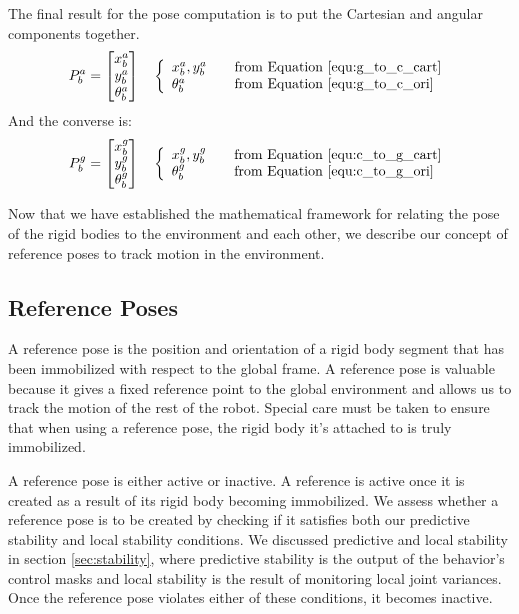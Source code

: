 The final result for the pose computation is to put the Cartesian and angular components together.
\begin{equation}
P_b^a =
\begin{bmatrix}
x_b^a \\
y_b^a \\
\theta_b^a 
\end{bmatrix}
\quad
\left\{ 
  \begin{array}{l l}
    x_b^a,y_b^a & \quad \text{from Equation \ref{equ:g_to_c_cart}}\\
    \theta_b^a & \quad \text{from Equation \ref{equ:g_to_c_ori}}
  \end{array} \right.
\end{equation}
And the converse is:
\begin{equation}
P_b^g =
\begin{bmatrix}
x_b^g \\
y_b^g \\
\theta_b^g 
\end{bmatrix}
\quad
\left\{ 
  \begin{array}{l l}
    x_b^g,y_b^g & \quad \text{from Equation \ref{equ:c_to_g_cart}}\\
    \theta_b^g & \quad \text{from Equation \ref{equ:c_to_g_ori}}
  \end{array} \right.
\end{equation}


Now that we have established the mathematical framework for relating the pose of the rigid bodies to the environment and each other, we describe our concept of reference poses to track motion in the environment.


\subsection{Reference Poses}

A reference pose is the position and orientation of a rigid body segment that has been immobilized with respect to the global frame.  A reference pose is valuable because it gives a fixed reference point to the global environment and allows us to track the motion of the rest of the robot.   Special care must be taken to ensure that when using a reference pose, the rigid body it's attached to is truly immobilized.

A reference pose is either active or inactive.  A reference is active once it is created as a result of its rigid body becoming immobilized.  We assess whether a reference pose is to be created by checking if it satisfies both our predictive stability and local stability conditions.  We discussed predictive and local stability in section \ref{sec:stability}, where predictive stability is the output of the behavior's control masks and local stability is the result of monitoring local joint variances.  Once the reference pose violates either of these conditions, it becomes inactive.

